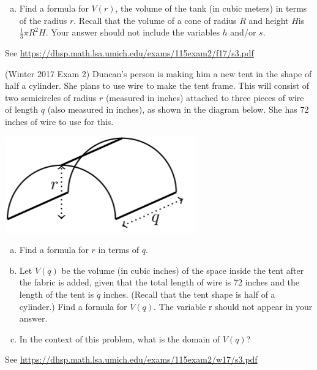 \documentclass[11pt]{exam}
\begin{document}
\begin{questions}
\begin{enumerate}[(a)]
\item Find a formula for $V(r)$, the volume of the tank (in cubic meters) in terms of the radius $r$. Recall that the volume of a cone of radius $R$ and height $H$is $\frac{1}{3} \pi R^2 H$. Your answer should not include the variables $h$ and/or $s$.
\end{enumerate}
\begin{solution}
  See \href{https://dhsp.math.lsa.umich.edu/exams/115exam2/f17/s3.pdf}{https://dhsp.math.lsa.umich.edu/exams/115exam2/f17/s3.pdf}
\end{solution}
\vspace{0.75in}
\question (Winter 2017 Exam 2) %
  Duncan’s person is making him a new tent in the shape of half a cylinder. She plans to use wire to make the tent frame. This will consist of two semicircles of radius $r$ (measured in inches) attached to three pieces of wire of length $q$ (also measured in inches), as shown in the diagram below. She has 72 inches of wire to use for this.
  \begin{center}
    \includegraphics[scale=0.4]{Duncan.png}
  \end{center}
\begin{enumerate}[(a)]
\item Find a formula for $r$ in terms of $q$.
\item Let $V (q)$ be the volume (in cubic inches) of the space inside the tent after the fabric is added, given that the total length of wire is 72 inches and the length of the tent is $q$ inches. (Recall that the tent shape is half of a cylinder.) Find a formula for $V (q)$. The variable r should not appear in your answer.
\item In the context of this problem, what is the domain of $V (q)$?
\end{enumerate}
\begin{solution}
 See \href{https://dhsp.math.lsa.umich.edu/exams/115exam2/w17/s3.pdf}{https://dhsp.math.lsa.umich.edu/exams/115exam2/w17/s3.pdf}
\end{solution}
\end{questions}
\end{document}
